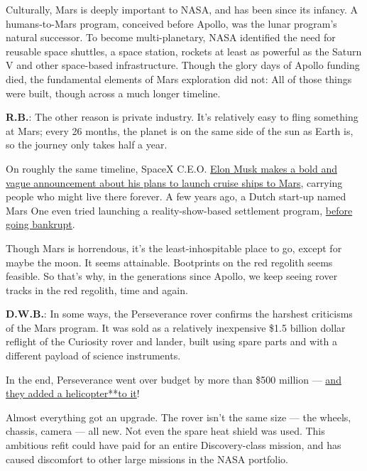 Culturally, Mars is deeply important to NASA, and has been since its
infancy. A humans-to-Mars program, conceived before Apollo, was the
lunar program's natural successor. To become multi-planetary, NASA
identified the need for reusable space shuttles, a space station,
rockets at least as powerful as the Saturn V and other space-based
infrastructure. Though the glory days of Apollo funding died, the
fundamental elements of Mars exploration did not: All of those things
were built, though across a much longer timeline.

\textbf{R.B.}: The other reason is private industry. It's relatively
easy to fling something at Mars; every 26 months, the planet is on the
same side of the sun as Earth is, so the journey only takes half a year.

On roughly the same timeline, SpaceX C.E.O.
\href{https://www.nytimes3xbfgragh.onion/2019/09/29/science/elon-musk-spacex-starship.html}{Elon
Musk makes a bold and vague announcement about his plans to launch
cruise ships to Mars}, carrying people who might live there forever. A
few years ago, a Dutch start-up named Mars One even tried launching a
reality-show-based settlement program,
\href{https://www.theverge.com/2019/2/11/18220153/mars-one-bankruptcy-bas-lansdorp-human-settlement}{before
going bankrupt}.

Though Mars is horrendous, it's the least-inhospitable place to go,
except for maybe the moon. It seems attainable. Bootprints on the red
regolith seems feasible. So that's why, in the generations since Apollo,
we keep seeing rover tracks in the red regolith, time and again.

\textbf{D.W.B.}: In some ways, the Perseverance rover confirms the
harshest criticisms of the Mars program. It was sold as a relatively
inexpensive \$1.5 billion dollar reflight of the Curiosity rover and
lander, built using spare parts and with a different payload of science
instruments.

In the end, Perseverance went over budget by more than \$500 million ---
\href{https://www.nytimes3xbfgragh.onion/2020/06/23/science/mars-helicopter-nasa.html}{and
they added a
helicopter}\href{https://www.nytimes3xbfgragh.onion/2020/06/23/science/mars-helicopter-nasa.html}{**}\href{https://www.nytimes3xbfgragh.onion/2020/06/23/science/mars-helicopter-nasa.html}{to
it}!

Almost everything got an upgrade. The rover isn't the same size --- the
wheels, chassis, camera --- all new. Not even the spare heat shield was
used. This ambitious refit could have paid for an entire Discovery-class
mission, and has caused discomfort to other large missions in the NASA
portfolio.

